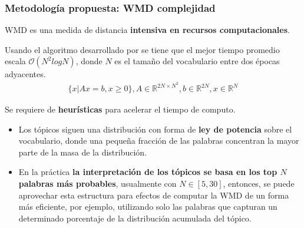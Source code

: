 \documentclass[
	spanish, %
	aspectratio=43, %
	hyperref={pdfencoding=auto,psdextra},
	xcolor={dvipsnames,table,usenames},
]{beamer}
\begin{document}
\begin{frame}[t]
\frametitle{Metodología propuesta: WMD complejidad}

WMD es una medida de distancia \textbf{intensiva en recursos computacionales}.\newline

Usando el algoritmo desarrollado por \cite{pele2009fast} se tiene que el mejor tiempo promedio escala $\mathcal{O}(N^{2}log N)$, donde $N$ es el tamaño del vocabulario entre dos épocas adyacentes.
  \begin{align*}
\{x| Ax=b, x\geq 0\}, A\in \mathbb{R}^{2N\times N^{2}}, b\in \mathbb{R}^{2N}, x\in \mathbb{R}^{N}
  \end{align*}

Se requiere de \textbf{heurísticas} para acelerar el tiempo de computo.
\begin{itemize}
  \item Los tópicos siguen una distribución con forma de \textbf{ley de potencia} sobre el vocabulario, donde una pequeña fracción de las palabras concentran la mayor parte de la masa de la distribución. 
  \item En la práctica \textbf{la interpretación de los tópicos se basa en los top $N$ palabras más probables}, usualmente con $N \in [5, 30]$, entonces, se puede aprovechar esta estructura para efectos de computar la WMD de un forma más eficiente, por ejemplo, utilizando solo las palabras que capturan un determinado porcentaje de la distribución acumulada del tópico.
\end{itemize}
\end{frame}
\end{document}

